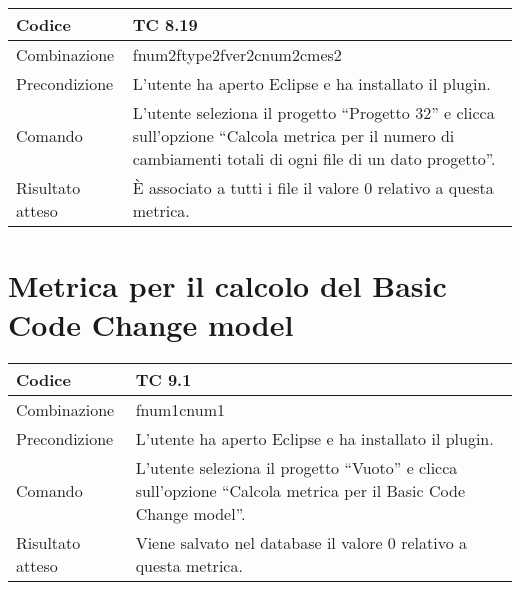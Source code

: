 \begin{table}[ht]
\begin{tabular}{|p{3cm}|p{9cm}|}
\hline
\cellcolor{lightgray}Codice				& TC 8.19								\\
\hline
\cellcolor{lightgray}Combinazione		& fnum2ftype2fver2cnum2cmes2									\\
\hline
\cellcolor{lightgray}Precondizione		& L'utente ha aperto Eclipse e ha installato il plugin.		\\
\hline
\cellcolor{lightgray}Comando			& L'utente seleziona il progetto ``Progetto 32''  e clicca sull'opzione ``Calcola metrica per il numero di cambiamenti totali di ogni file di un dato progetto''.	\\
\hline
\cellcolor{lightgray}Risultato atteso	& È associato a tutti i file il valore 0 relativo a questa metrica.\\
\hline
\end{tabular}
\end{table}

\clearpage

\section{Metrica per il calcolo del Basic Code Change model}

\begin{table}[ht]
\begin{tabular}{|p{3cm}|p{9cm}|}
\hline
\cellcolor{lightgray}Codice				& TC 9.1								\\
\hline
\cellcolor{lightgray}Combinazione		& fnum1cnum1									\\
\hline
\cellcolor{lightgray}Precondizione		& L'utente ha aperto Eclipse e ha installato il plugin.		\\
\hline
\cellcolor{lightgray}Comando			& L'utente seleziona il progetto ``Vuoto''  e clicca sull'opzione ``Calcola metrica per il Basic Code Change model''.	\\
\hline
\cellcolor{lightgray}Risultato atteso	& Viene salvato nel database il valore 0 relativo a questa metrica.\\
\hline
\end{tabular}
\end{table}


